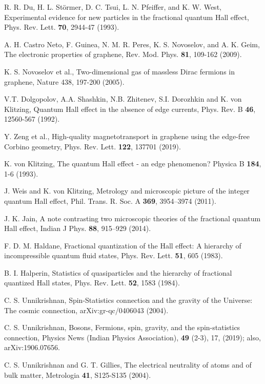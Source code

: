 \documentclass[aps,preprint,12pt,tightenlines]{revtex4}%
\begin{document}
\begin{thebibliography}{99}
R. R. Du, H. L. St\"{o}rmer, D. C. Tsui, L. N. Pfeiffer, and K. W. West, Experimental evidence for new particles in the fractional quantum Hall effect, Phys. Rev. Lett. \textbf{70}, 2944-47 (1993).

A. H. Castro Neto, F. Guinea, N. M. R. Peres, K. S.
Novoselov, and A. K. Geim, The electronic properties of graphene, Rev. Mod.
Phys. \textbf{81}, 109-162 (2009).

K. S. Novoselov et al., Two-dimensional gas of
massless Dirac fermions in graphene, Nature 438, 197-200 (2005).

V.T. Dolgopolov, A.A. Shashkin, N.B. Zhitenev, S.I.
Dorozhkin and K. von Klitzing, Quantum Hall effect in the absence of edge
currents, Phys. Rev. B \textbf{46}, 12560-567 (1992).

Y. Zeng et al., High-quality magnetotransport in graphene using
the edge-free Corbino geometry, Phys. Rev. Lett. \textbf{122}, 137701 (2019).

K. von Klitzing, The quantum Hall effect - an edge
phenomenon? Physica B \textbf{184}, 1-6 (1993).

J. Weis and K. von Klitzing, Metrology and microscopic
picture of the integer quantum Hall effect, Phil. Trans. R. Soc. A
\textbf{369}, 3954--3974 (2011).

J. K. Jain, A note contrasting two microscopic
theories of the fractional quantum Hall effect, Indian J Phys. \textbf{88},
915--929 (2014).

F. D. M. Haldane, Fractional quantization of the Hall
effect: A hierarchy of incompressible quantum fluid states, Phys. Rev. Lett.
\textbf{51}, 605 (1983).

B. I. Halperin, Statistics of quasiparticles and the
hierarchy of fractional quantized Hall states, Phys. Rev. Lett. \textbf{52},
1583 (1984).

C. S. Unnikrishnan, Spin-Statistics connection and the gravity of the Universe: The cosmic connection, arXiv:gr-qc/0406043 (2004).

C. S. Unnikrishnan, Bosons, Fermions, spin, gravity,
and the spin-statistics connection, Physics News (Indian Physics Association),
\textbf{49} (2-3), 17, (2019); also, arXiv:1906.07656.

C. S. Unnikrishnan and G. T. Gillies, The electrical
neutrality of atoms and of bulk matter, Metrologia \textbf{41}, S125-S135 (2004).


\end{thebibliography}
\end{document}
